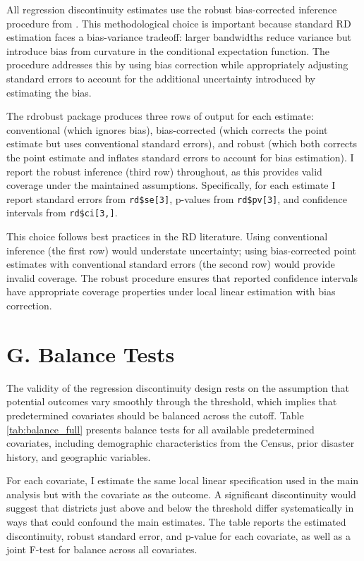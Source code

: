 \documentclass[12pt,letterpaper,oneside]{book}
\begin{document}
All regression discontinuity estimates use the robust bias-corrected inference procedure from \cite{calonico2014robust}. This methodological choice is important because standard RD estimation faces a bias-variance tradeoff: larger bandwidths reduce variance but introduce bias from curvature in the conditional expectation function. The \cite{calonico2014robust} procedure addresses this by using bias correction while appropriately adjusting standard errors to account for the additional uncertainty introduced by estimating the bias.

The rdrobust package produces three rows of output for each estimate: conventional (which ignores bias), bias-corrected (which corrects the point estimate but uses conventional standard errors), and robust (which both corrects the point estimate and inflates standard errors to account for bias estimation). I report the robust inference (third row) throughout, as this provides valid coverage under the maintained assumptions. Specifically, for each estimate I report standard errors from \texttt{rd\$se[3]}, p-values from \texttt{rd\$pv[3]}, and confidence intervals from \texttt{rd\$ci[3,]}.

This choice follows best practices in the RD literature. Using conventional inference (the first row) would understate uncertainty; using bias-corrected point estimates with conventional standard errors (the second row) would provide invalid coverage. The robust procedure ensures that reported confidence intervals have appropriate coverage properties under local linear estimation with bias correction.

\section*{G. Balance Tests}

The validity of the regression discontinuity design rests on the assumption that potential outcomes vary smoothly through the threshold, which implies that predetermined covariates should be balanced across the cutoff. Table \ref{tab:balance_full} presents balance tests for all available predetermined covariates, including demographic characteristics from the Census, prior disaster history, and geographic variables.

For each covariate, I estimate the same local linear specification used in the main analysis but with the covariate as the outcome. A significant discontinuity would suggest that districts just above and below the threshold differ systematically in ways that could confound the main estimates. The table reports the estimated discontinuity, robust standard error, and p-value for each covariate, as well as a joint F-test for balance across all covariates.
\end{document}
